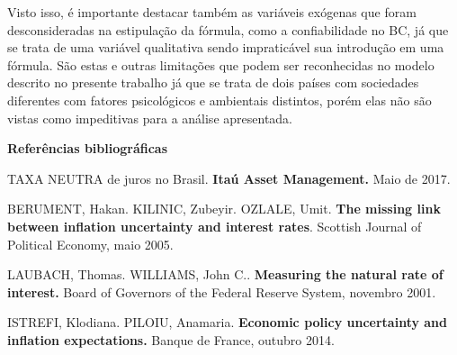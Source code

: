  Visto isso, \'{e} importante destacar tamb\'{e}m as vari\'{a}veis ex\'{o}genas que foram desconsideradas na estipula\c{c}\~{a}o da f\'{o}rmula, como a confiabilidade no BC, j\'{a} que se trata de uma vari\'{a}vel qualitativa sendo impratic\'{a}vel sua introdu\c{c}\~{a}o em uma f\'{o}rmula. S\~{a}o estas e outras limita\c{c}\~{o}es que podem ser reconhecidas no modelo descrito no presente trabalho j\'{a} que se trata de dois pa\'{i}ses com sociedades diferentes com fatores psicol\'{o}gicos e ambientais distintos, por\'{e}m elas n\~{a}o s\~{a}o vistas como impeditivas para a an\'{a}lise apresentada. 

\noindent 

\noindent 

\noindent \textbf{Refer\^{e}ncias bibliogr\'{a}ficas}

\noindent 

\noindent TAXA NEUTRA de juros no Brasil. \textbf{Ita\'{u} Asset Management. }Maio de 2017. 

\noindent 

\noindent BERUMENT, Hakan. KILINIC, Zubeyir. OZLALE, Umit. \textbf{The missing link between inflation uncertainty and interest rates}. Scottish Journal of Political Economy, maio 2005.

\noindent 

\noindent LAUBACH, Thomas. WILLIAMS, John C.. \textbf{Measuring the natural rate of interest. }Board of Governors of the Federal Reserve System, novembro 2001. 

\noindent 

\noindent ISTREFI, Klodiana. PILOIU, Anamaria. \textbf{Economic policy uncertainty and inflation expectations. }Banque de France, outubro 2014. \textit{}



